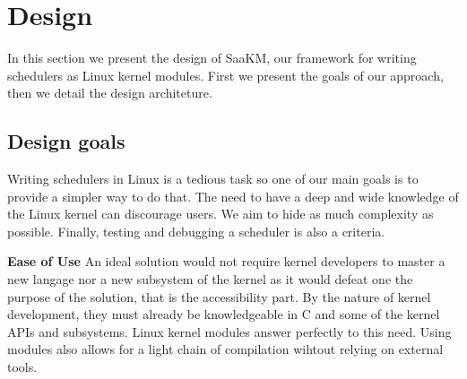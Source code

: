 \section{Design}
\label{sec:scheduler-as-a-kernel-module}



\par In this section we present the design of SaaKM, our framework for writing schedulers as Linux kernel modules. First we present the goals of our approach, then we detail the design architeture.\newline

\subsection{Design goals} Writing schedulers in Linux is a tedious task so one of our main goals is to provide a simpler way to do that. The need to have a deep and wide knowledge of the Linux kernel can discourage users. We aim to hide as much complexity as possible. Finally, testing and debugging a scheduler is also a criteria.\newline

\textbf{Ease of Use} An ideal solution would not require kernel developers to master a new langage nor a new subsystem of the kernel as it would defeat one the purpose of the solution, that is the accessibility part. By the nature of kernel development, they must already be knowledgeable in C and some of the kernel APIs and subsystems. Linux kernel modules answer perfectly to this need. Using modules also allows for a light chain of compilation wihtout relying on external tools.\newline

